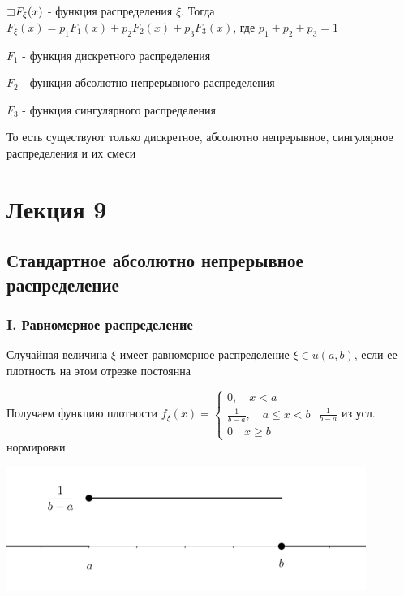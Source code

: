 \documentclass[12pt]{article}
\begin{document}
    \begin{MyTheorem}

        $\mathord{\sqsupset} F_\xi(x)$ - функция распределения $\xi$. Тогда $F_\xi(x) = p_1 F_1(x) + p_2 F_2(x) + p_3 F_3(x)$, где $p_1 + p_2 + p_3 = 1$

        $F_1$ - функция дискретного распределения

        $F_2$ - функция абсолютно непрерывного распределения

        $F_3$ - функция сингулярного распределения

        То есть существуют только дискретное, абсолютно непрерывное, сингулярное распределения и их смеси
    \end{MyTheorem}


    \section{Лекция 9}

    \subsection{Стандартное абсолютно непрерывное распределение}

    \subsubsection{I. Равномерное распределение}

    \Defs Случайная величина $\xi$ имеет равномерное распределение $\xi \in u(a, b)$, если ее плотность
    на этом отрезке постоянна

    Получаем функцию плотности $f_\xi(x) = \begin{cases}0, \quad x < a \\ \frac{1}{b - a}, \quad a \leq x < b \\ 0 \quad x \geq b\end{cases}$ \hfill {\scriptsize $\frac{1}{b - a}$ из усл. нормировки}

    \includegraphics[height=4cm]{probtheory/images/probtheory_2024_10_29_1}
\end{document}
